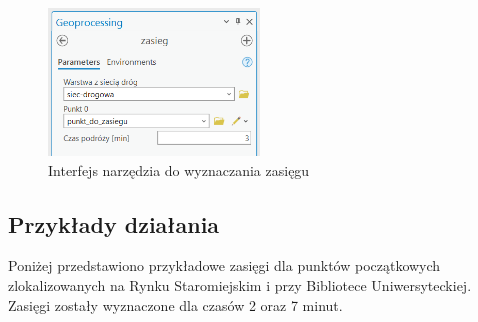 \documentclass{article}
\begin{document}
\begin{figure}[H]
    \centering
    \includegraphics[width=0.5\textwidth]{img/narzedzie-interfejs-zasieg.png}
    \caption{ Interfejs narzędzia do wyznaczania zasięgu}
\end{figure}

\subsection{Przykłady działania}
Poniżej przedstawiono przykładowe zasięgi dla punktów początkowych zlokalizowanych na Rynku Staromiejskim i przy Bibliotece Uniwersyteckiej. Zasięgi zostały wyznaczone dla czasów 2 oraz 7 minut.
\end{document}
